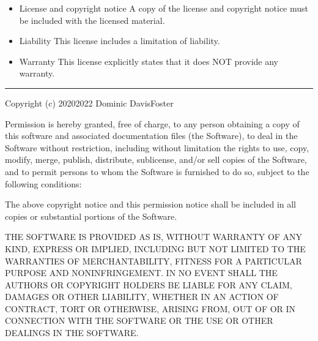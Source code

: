 \documentclass[letterpaper,10pt,english]{sphinxmanual}
\begin{document}
\vspace{10px}

\begin{itemize}
\item {}
License and copyright notice \textendash{} A copy of the license and copyright notice must be included with the licensed material.

\end{itemize}

\vspace{10px}

\begin{itemize}
\item {}
Liability \textendash{} This license includes a limitation of liability.

\item {}
Warranty \textendash{} This license explicitly states that it does NOT provide any warranty.

\end{itemize}

\begin{flushright}



\end{flushright}


\bigskip\hrule\bigskip




\begin{sphinxVerbatim}[commandchars=\\\{\}]
Copyright (c) 2020\PYGZhy{}2022 Dominic Davis\PYGZhy{}Foster

Permission is hereby granted, free of charge, to any person obtaining a copy
of this software and associated documentation files (the \PYGZdq{}Software\PYGZdq{}), to deal
in the Software without restriction, including without limitation the rights
to use, copy, modify, merge, publish, distribute, sublicense, and/or sell
copies of the Software, and to permit persons to whom the Software is
furnished to do so, subject to the following conditions:

The above copyright notice and this permission notice shall be included in all
copies or substantial portions of the Software.

THE SOFTWARE IS PROVIDED \PYGZdq{}AS IS\PYGZdq{}, WITHOUT WARRANTY OF ANY KIND,
EXPRESS OR IMPLIED, INCLUDING BUT NOT LIMITED TO THE WARRANTIES OF
MERCHANTABILITY, FITNESS FOR A PARTICULAR PURPOSE AND NONINFRINGEMENT.
IN NO EVENT SHALL THE AUTHORS OR COPYRIGHT HOLDERS BE LIABLE FOR ANY CLAIM,
DAMAGES OR OTHER LIABILITY, WHETHER IN AN ACTION OF CONTRACT, TORT OR
OTHERWISE, ARISING FROM, OUT OF OR IN CONNECTION WITH THE SOFTWARE OR THE USE
OR OTHER DEALINGS IN THE SOFTWARE.
\end{sphinxVerbatim}




\renewcommand{\indexname}{Index}
\printindex
\end{document}
